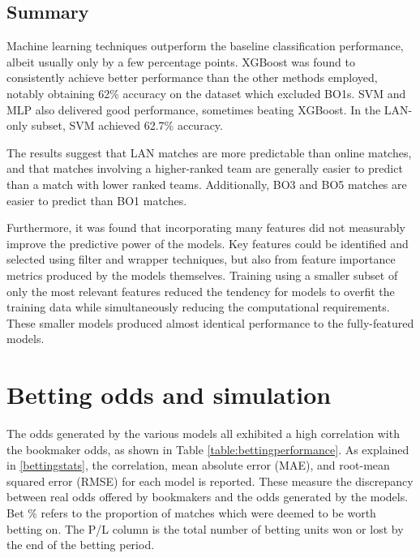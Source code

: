 \subsection{Summary}

Machine learning techniques outperform the baseline classification performance, albeit usually only by a few percentage points. XGBoost was found to consistently achieve better performance than the other methods employed, notably obtaining 62\% accuracy on the dataset which excluded BO1s. SVM and MLP also delivered good performance, sometimes beating XGBoost. In the LAN-only subset, SVM achieved 62.7\% accuracy.

The results suggest that LAN matches are more predictable than online matches, and that matches involving a higher-ranked team are generally easier to predict than a match with lower ranked teams. Additionally, BO3 and BO5 matches are easier to predict than BO1 matches.

Furthermore, it was found that incorporating many features did not measurably improve the predictive power of the models. Key features could be identified and selected using filter and wrapper techniques, but also from feature importance metrics produced by the models themselves. Training using a smaller subset of only the most relevant features reduced the tendency for models to overfit the training data while simultaneously reducing the computational requirements. These smaller models produced almost identical performance to the fully-featured models. 

\section{Betting odds and simulation}

The odds generated by the various models all exhibited a high correlation with the bookmaker odds, as shown in Table \ref{table:bettingperformance}. As explained in \ref{bettingstats}, the correlation, mean absolute error (MAE), and root-mean squared error (RMSE) for each model is reported. These measure the discrepancy between real odds offered by bookmakers and the odds generated by the models. Bet \% refers to the proportion of matches which were deemed to be worth betting on. The P/L column is the total number of betting units won or lost by the end of the betting period.

